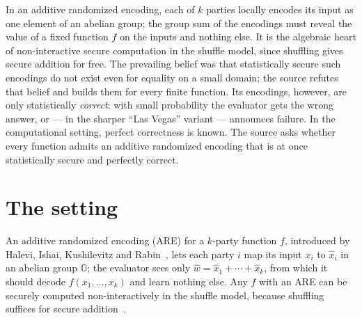 \documentclass{aicr-conjecture}
\newcommand{\Gr}{\mathbb{G}}
\begin{document}

\vspace{0.4em}

\begin{informalconjecture}
In an additive randomized encoding, each of $k$ parties locally encodes
its input as one element of an abelian group; the group sum of the
encodings must reveal the value of a fixed function $f$ on the inputs and
nothing else. It is the algebraic heart of non-interactive secure
computation in the shuffle model, since shuffling gives secure addition
for free. The prevailing belief was that statistically secure such
encodings do not exist even for equality on a small domain; the source
refutes that belief and builds them for every finite function. Its
encodings, however, are only statistically \emph{correct}: with small
probability the evaluator gets the wrong answer, or --- in the sharper
``Las Vegas'' variant --- announces failure. In the computational
setting, perfect correctness is known. The source asks whether every
function admits an additive randomized encoding that is at once
statistically secure and perfectly correct.
\end{informalconjecture}

\section{The setting}\label{sec:setting}

An additive randomized encoding (ARE) for a $k$-party function $f$,
introduced by Halevi, Ishai, Kushilevitz and Rabin~\cite{HIKR23}, lets
each party $i$ map its input $x_{i}$ to $\hat{x}_{i}$ in an abelian
group $\Gr$; the evaluator sees only $\hat{w} = \hat{x}_{1} + \cdots +
\hat{x}_{k}$, from which it should decode $f(x_{1}, \dots, x_{k})$ and
learn nothing else. Any $f$ with an ARE can be securely computed
non-interactively in the shuffle model, because shuffling suffices for
secure addition~\cite{IKOS06}.
\end{document}
